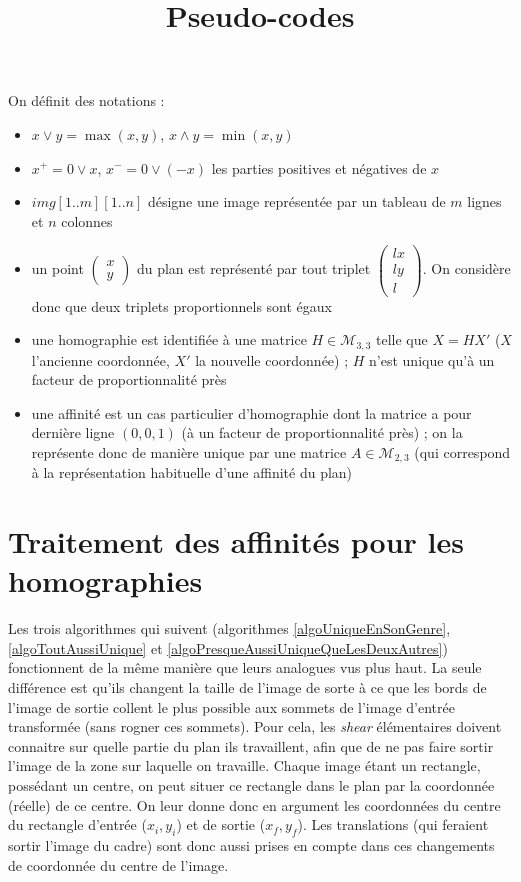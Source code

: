 \documentclass[a4paper,11pt]{article}
\title{Pseudo-codes}
\newcommand{\pmatrice}[1]{\begin{pmatrix} #1 \end{pmatrix}}
\newcommand{\pgcd}{\wedge}
\newcommand{\ppcm}{\vee}
\begin{document}
 \maketitle
 On définit des notations :
 \begin{itemize}
 \item $x \ppcm y = \max(x,y)$, $x \pgcd y = \min(x,y)$
 \item $x^+ = 0 \ppcm x$, $x^- = 0 \ppcm (-x)$ les parties positives et négatives de $x$
 \item $img[1..m][1..n]$ désigne une image représentée par un tableau de $m$ lignes et $n$ colonnes
 \item un point $\pmatrice{x\\y}$ du plan est représenté par tout triplet $\pmatrice{lx\\ly\\l}$. On considère donc que deux triplets proportionnels sont égaux
 \item une homographie est identifiée à une matrice $H \in \mathcal{M}_{3,3}$ telle que $X=HX'$ ($X$ l'ancienne coordonnée, $X'$ la nouvelle coordonnée) ; $H$ n'est unique qu'à un facteur de proportionnalité près
 \item une affinité est un cas particulier d'homographie dont la matrice a pour dernière ligne $(0,0,1)$ (à un facteur de proportionnalité près) ; on la représente donc de manière unique par une matrice $A \in \mathcal{M}_{2,3}$ (qui correspond à la représentation habituelle d'une affinité du plan)
 \end{itemize}


\section*{Traitement des affinités pour les homographies}
  Les trois algorithmes qui suivent (algorithmes \ref{algoUniqueEnSonGenre}, \ref{algoToutAussiUnique} et \ref{algoPresqueAussiUniqueQueLesDeuxAutres}) fonctionnent de la même manière que leurs analogues vus plus haut. La seule différence est qu'ils changent la taille de l'image de sorte à ce que les bords de l'image de sortie collent le plus possible aux sommets de l'image d'entrée transformée (sans rogner ces sommets). Pour cela, les \emph{shear} élémentaires doivent connaitre sur quelle partie du plan ils travaillent, afin que de ne pas faire sortir l'image de la zone sur laquelle on travaille. Chaque image étant un rectangle, possédant un centre, on peut situer ce rectangle dans le plan par la coordonnée (réelle) de ce centre. On leur donne donc en argument les coordonnées du centre du rectangle d'entrée ($x_i,y_i$) et de sortie ($x_f,y_f$). Les translations (qui feraient sortir l'image du cadre) sont donc aussi prises en compte dans ces changements de coordonnée du centre de l'image.
  
\end{document}
